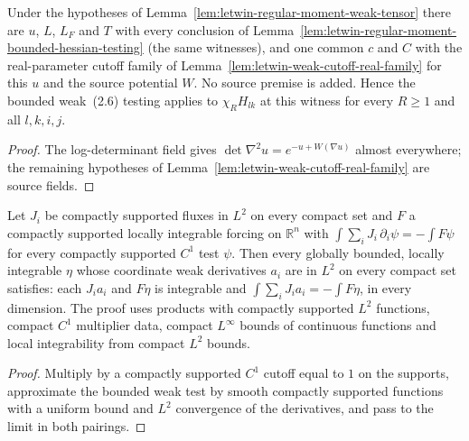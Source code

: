 \begin{lemma}
  \label{lem:letwin-regular-moment-weak-cutoffs}
  \leanok
  Under the hypotheses of Lemma~\ref{lem:letwin-regular-moment-weak-tensor} there are $u$, $L$, $L_F$ and $T$ with every conclusion of
  Lemma~\ref{lem:letwin-regular-moment-bounded-hessian-testing} (the same witnesses), and one common $c$ and $C$ with the real-parameter
  cutoff family of Lemma~\ref{lem:letwin-weak-cutoff-real-family} for this $u$ and the source potential $W$. No source premise is added.
  Hence the bounded weak~(2.6) testing applies to $\chi_R H_{lk}$ at this witness for every $R\ge1$ and all $l,k,i,j$.
\end{lemma}
\begin{proof}
  \leanok
  The log-determinant field gives $\det\nabla^2u=e^{-u+W(\nabla u)}$ almost everywhere; the remaining hypotheses of
  Lemma~\ref{lem:letwin-weak-cutoff-real-family} are source fields.
\end{proof}

\begin{lemma}
  \label{lem:weak-compact-flux-bounded-test}
  \leanok
  Let $J_i$ be compactly supported fluxes in $L^2$ on every compact set and $F$ a compactly supported locally integrable forcing on
  $\mathbb R^n$ with $\int\sum_i J_i\,\partial_i\psi=-\int F\psi$ for every compactly supported $C^1$ test $\psi$. Then every globally bounded,
  locally integrable $\eta$ whose coordinate weak derivatives $a_i$ are in $L^2$ on every compact set satisfies: each $J_ia_i$ and $F\eta$
  is integrable and $\int\sum_iJ_ia_i=-\int F\eta$, in every dimension. The proof uses products with compactly
  supported $L^2$ functions, compact $C^1$ multiplier data, compact $L^\infty$ bounds of continuous functions and local integrability
  from compact $L^2$ bounds.
\end{lemma}
\begin{proof}
  \leanok
  Multiply by a compactly supported $C^1$ cutoff equal to $1$ on the supports, approximate the bounded weak test by smooth compactly
  supported functions with a uniform bound and $L^2$ convergence of the derivatives, and pass to the limit in both pairings.
\end{proof}


